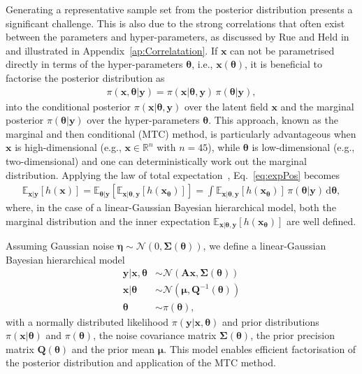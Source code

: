 Generating a representative sample set from the posterior distribution presents a significant challenge. This is also due to the strong correlations that often exist between the parameters and hyper-parameters, as discussed by Rue and Held in \cite{rue2005gaussian} and illustrated in Appendix~\ref{ap:Correlatation}.
If $\bm{x}$ can not be parametrised directly in terms of the hyper-parameters $\bm{\theta}$, i.e., $\bm{x}(\bm{\theta})$, it is beneficial to factorise the posterior distribution as
\begin{align}
	\pi(\bm{x}, \bm{\theta} |  \bm{y}) = \pi(\bm{x} |  \bm{\theta}, \bm{y}) \, \pi(\bm{\theta} |   \bm{y}),
\end{align}
into the conditional posterior $\pi(\bm{x} |  \bm{\theta}, \bm{y})$ over the latent field $\bm{x}$ and the marginal posterior $\pi(\bm{\theta} |  \bm{y})$ over the hyper-parameters $\bm{\theta}$.
This approach, known as the marginal and then conditional (MTC) method, is particularly advantageous when $\bm{x}$ is high-dimensional (e.g., $\bm{x} \in \mathbb{R}^n$ with $n = 45$), while $\bm{\theta}$ is low-dimensional (e.g., two-dimensional) and one can deterministically work out the marginal distribution.
Applying the law of total expectation~\cite{champ2022generalizedlawtotalcovariance}, Eq.~\eqref{eq:expPos} becomes
\begin{align}
	\mathbb{E}_{\bm{x} |  \bm{y}} [h(\bm{x})] 
	= \mathbb{E}_{\bm{\theta} |  \bm{y}} \left[ \mathbb{E}_{\bm{x} |  \bm{\theta}, \bm{y}} [h(\bm{x}_{\bm{\theta}})] \right] 
	= \int \mathbb{E}_{\bm{x} |  \bm{\theta}, \bm{y}} \left[ h(\bm{x}_{\bm{\theta}}) \right] \, \pi(\bm{\theta} |  \bm{y}) \, \mathrm{d}\bm{\theta},
	\label{eq:MargExpPos}
\end{align}
where, in the case of a linear-Gaussian Bayesian hierarchical model, both the marginal distribution and the inner expectation $\mathbb{E}_{\bm{x} |  \bm{\theta}, \bm{y}} \left[ h(\bm{x}_{\bm{\theta}}) \right]$ are well defined.

Assuming Gaussian noise $\bm{\eta} \sim \mathcal{N}(0, \bm{\Sigma}(\bm{\theta}))$, we define a linear-Gaussian Bayesian hierarchical model~\cite{fox2016fast}
\begin{subequations}
	\begin{align}
		\bm{y} |  \bm{x}, \bm{\theta} &\sim \mathcal{N}(\bm{A} \bm{x}, \bm{\Sigma}(\bm{\theta})) \label{eq:likelihood} \\
		\bm{x} |  \bm{\theta} &\sim \mathcal{N}(\bm{\mu}, \bm{Q}^{-1}(\bm{\theta})) \label{eq:xPrior} \\
		\bm{\theta} &\sim \pi(\bm{\theta}) \label{eq:gammaPrior},
	\end{align}
	\label{eq:BayMode}
\end{subequations}
with a normally distributed likelihood $\pi(\bm{y} |  \bm{x}, \bm{\theta})$ and prior distributions $\pi(\bm{x} |  \bm{\theta})$ and $\pi(\bm{\theta})$, the noise covariance matrix $\bm{\Sigma}(\bm{\theta})$, the prior precision matrix $\bm{Q}(\bm{\theta})$ and the prior mean $\bm{\mu}$.
This model enables efficient factorisation of the posterior distribution and application of the MTC method.



